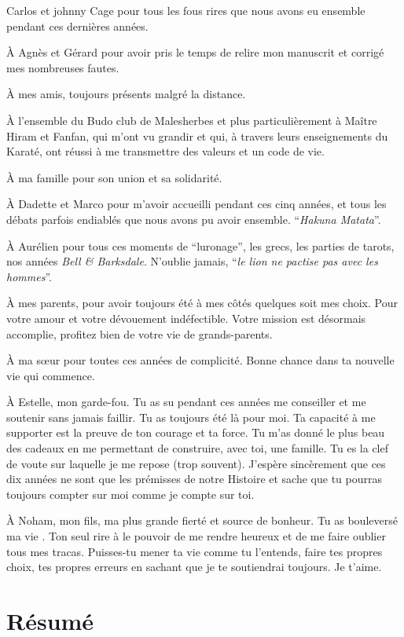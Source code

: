 \documentclass[12pt,twoside]{ugathesis}
\begin{document}
Carlos et johnny Cage pour tous les fous rires que nous avons eu
ensemble pendant ces dernières années.

À Agnès et Gérard pour avoir pris le temps de relire mon manuscrit et
corrigé mes nombreuses fautes.

À mes amis, toujours présents malgré la distance.

À l'ensemble du Budo club de Malesherbes et plus particulièrement à
Maître Hiram et Fanfan, qui m'ont vu grandir et qui, à travers leurs
enseignements du Karaté, ont réussi à me transmettre des valeurs et un
code de vie.

À ma famille pour son union et sa solidarité.

À Dadette et Marco pour m'avoir accueilli pendant ces cinq années, et
tous les débats parfois endiablés que nous avons pu avoir ensemble.
``\emph{Hakuna Matata}''.

À Aurélien pour tous ces moments de ``luronage'', les grecs, les parties
de tarots, nos années \emph{Bell \& Barksdale}. N'oublie jamais,
``\emph{le lion ne pactise pas avec les hommes}''.

À mes parents, pour avoir toujours été à mes côtés quelques soit mes
choix. Pour votre amour et votre dévouement indéfectible. Votre mission
est désormais accomplie, profitez bien de votre vie de grands-parents.

À ma sœur pour toutes ces années de complicité. Bonne chance dans ta
nouvelle vie qui commence.

À Estelle, mon garde-fou. Tu as su pendant ces années me conseiller et
me soutenir sans jamais faillir. Tu as toujours été là pour moi. Ta
capacité à me supporter est la preuve de ton courage et ta force. Tu
m'as donné le plus beau des cadeaux en me permettant de construire, avec
toi, une famille. Tu es la clef de voute sur laquelle je me repose (trop
souvent). J'espère sincèrement que ces dix années ne sont que les
prémisses de notre Histoire et sache que tu pourras toujours compter sur
moi comme je compte sur toi.

À Noham, mon fils, ma plus grande fierté et source de bonheur. Tu as
bouleversé ma vie . Ton seul rire à le pouvoir de me rendre heureux et
de me faire oublier tous mes tracas. Puisses-tu mener ta vie comme tu
l'entends, faire tes propres choix, tes propres erreurs en sachant que
je te soutiendrai toujours. Je t'aime.

\chapter*{Résumé}\label{resume}
\end{document}
